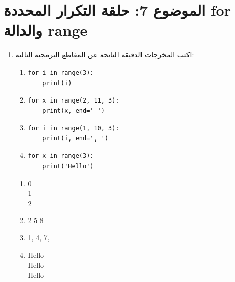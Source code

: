 \documentclass[14pt]{extarticle}
\begin{document}
\section*{الموضوع 7: حلقة التكرار المحددة \textenglish{for} والدالة \textenglish{range}}
\begin{enumerate}[itemsep=3em]

\item
اكتب المخرجات الدقيقة الناتجة عن المقاطع البرمجية التالية:
\begin{enumerate}
    \item
\begin{boxCode}
\begin{english}
\begin{verbatim}
for i in range(3):
    print(i)
\end{verbatim}
\end{english}
\end{boxCode}
    \item
\begin{boxCode}
\begin{english}
\begin{verbatim}
for x in range(2, 11, 3):
    print(x, end=' ')
\end{verbatim}
\end{english}
\end{boxCode}
    \item
\begin{boxCode}
\begin{english}
\begin{verbatim}
for i in range(1, 10, 3):
    print(i, end=', ')
\end{verbatim}
\end{english}
\end{boxCode}
    \item
\begin{boxCode}
\begin{english}
\begin{verbatim}
for x in range(3):
    print('Hello')
\end{verbatim}
\end{english}
\end{boxCode}
\end{enumerate}

\ifwithsols
\begin{boxSolution}
\begin{enumerate}
    \item \textenglish{0} \\ \textenglish{1} \\ \textenglish{2}
    \item \textenglish{2 5 8 }
    \item \textenglish{1, 4, 7, }
    \item \textenglish{Hello} \\ \textenglish{Hello} \\ \textenglish{Hello}
\end{enumerate}
\end{boxSolution}
\fi


\end{enumerate}
\end{document}
